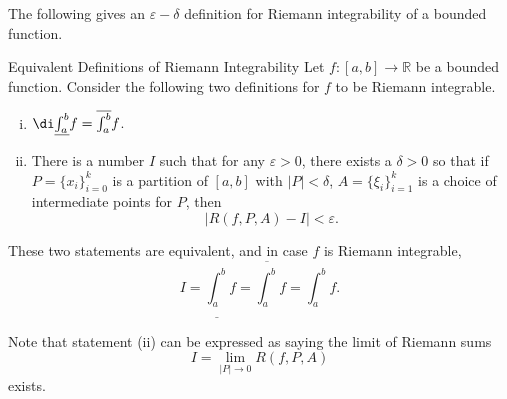 The following gives an $\varepsilon-\delta$ definition for Riemann integrability of a bounded function.
\begin{theorem}[label=230220_15]{Equivalent Definitions of Riemann Integrability}
Let $f:[a,b]\to\mathbb{R}$ be a bounded function. Consider  the following two definitions for $f$ to be Riemann integrable.
\begin{enumerate}[(i)]
\item $\di \underline{\int_a^b }f=\overline{\int_a^b} f$.

\item There is a number $I$ such that for any $\varepsilon>0$, there exists a $\delta>0$ so that   if $P=\{x_i\}_{i=0}^{k}$ is a partition of $[a,b]$ with $|P|<\delta$, $A=\{\xi_i\}_{i=1}^k$ is a choice of intermediate points for $P$, then
\[|R(f,P,A)-I|<\varepsilon.\]

\end{enumerate}
These two statements are equivalent, and in case $f$ is Riemann integrable, \[I=\underline{\int_a^b }f=\overline{\int_a^b} f=\int_a^b f.\]
\end{theorem}
Note that statement  (ii) can be  expressed as saying the limit of Riemann sums
\[I=\lim_{|P| \to 0}R(f, P, A)\]exists.
 

